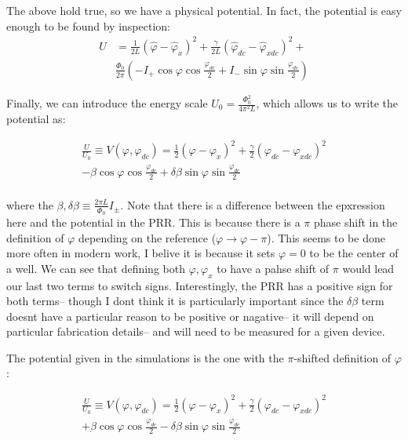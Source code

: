 \documentclass[paper=a4, twocolumn, fontsize=10pt]{article} %
\numberwithin{equation}{section} %
\numberwithin{figure}{section} %
\numberwithin{table}{section} %
\def \df#1{\hat{#1}}
\def \dl#1{#1}
\begin{document}
The above hold true, so we have a physical potential. In fact, the potential is easy enough to be found by inspection: 
\begin{align}
U &= \frac{1}{2L} (\df\varphi-\df\varphi_x)^2 + \frac{\gamma}{2L} (\df\varphi_{dc}-\df\varphi_{xdc})^2 + \\
 &\frac{\Phi_0}{2\pi}  \left( - I_+ \cos \dl\varphi \cos \frac{\dl\varphi_{dc}}{2} + I_- \sin \dl\varphi \sin \frac{\dl\varphi_{dc}}{2}\right)
\end{align}

Finally, we can introduce the energy scale $U_0 = \frac{ \Phi_0^2}{4\pi^2 L} $, which allows us to write the potential as:

\begin{align}
    \frac{U}{U_0} \equiv V(\dl\varphi, \dl\varphi_{dc}) =  \frac{1}{2} (\dl\varphi-\dl\varphi_x)^2 + \frac{\gamma}{2} (\dl\varphi_{dc}-\dl\varphi_{xdc})^2
    \\
     - \beta \cos \dl\varphi \cos \frac{\dl\varphi_{dc}}{2} + \delta\beta \sin \dl\varphi \sin \frac{\dl\varphi_{dc}}{2}
    \\
\end{align}

where the $\beta,\delta\beta \equiv \frac{2\pi L}{\Phi_0} I_{\pm}$. Note that there is a difference between the epxression here and the potential in the PRR. This is because there is a $\pi$ phase shift in the definition of $\varphi$ depending on the reference ($\varphi \to \varphi-\pi$). This seems to be done more often in modern work, I belive it is because it sets $\varphi=0$ to be the center of a well. We can see that defining both $\varphi,\varphi_{x}$ to have a pahse shift of $\pi$ would lead our last two terms to switch signs. Interestingly, the PRR has a positive sign for both terms-- though I dont think it is particularly important since the $\delta\beta$ term doesnt have a particular reason to be positive or nagative-- it will depend on particular fabrication details-- and will need to be measured for a given device.

The potential given in the simulations is the one with the $\pi$-shifted definition of $\varphi$:

\begin{align}
    \frac{U}{U_0} \equiv V(\varphi, \varphi_{dc}) =  \frac{1}{2} (\varphi-\varphi_x)^2 + \frac{\gamma}{2} (\varphi_{dc}-\varphi_{xdc})^2
    \\
     + \beta \cos \varphi \cos \frac{\varphi_{dc}}{2} - \delta\beta \sin \varphi \sin \frac{\varphi_{dc}}{2}
    \\
\end{align}
\end{document}
